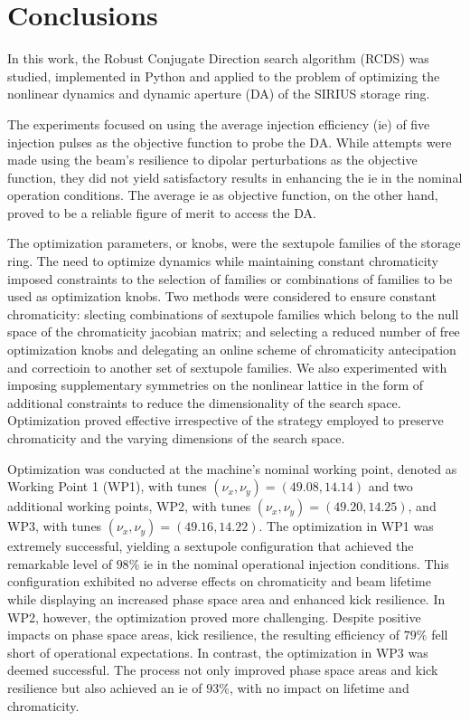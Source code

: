 \chapter{Conclusions}

In this work, the Robust Conjugate Direction search algorithm (\gls*{RCDS}) was studied, implemented in Python and applied to the problem of optimizing the nonlinear dynamics and dynamic aperture (\gls*{DA}) of the SIRIUS storage ring.

The experiments focused on using the average injection efficiency (\gls*{ie}) of five injection pulses as the objective function to probe the \gls*{DA}. While attempts were made using the beam's resilience to dipolar perturbations as the objective function, they did not yield satisfactory results in enhancing the \gls*{ie} in the nominal operation conditions. The average \gls*{ie} as objective function, on the other hand, proved to be a reliable figure of merit to access the \gls*{DA}.

The optimization parameters, or knobs, were the sextupole families of the storage ring. The need to optimize dynamics while maintaining constant chromaticity imposed constraints to the selection of families or combinations of families to be used as optimization knobs. Two methods were considered to ensure constant chromaticity: slecting combinations of sextupole families which belong to the null space of the chromaticity jacobian matrix; and selecting a reduced number of free optimization knobs and delegating an online scheme of chromaticity antecipation and correctioin to another set of sextupole families. We also experimented with imposing supplementary symmetries on the nonlinear lattice in the form of additional constraints to reduce the dimensionality of the search space. Optimization proved effective irrespective of the strategy employed to preserve chromaticity and the varying dimensions of the search space.

Optimization was conducted at the machine's nominal working point, denoted as Working Point 1 (\gls*{WP1}), with tunes $(\nu_x, \nu_y)=(49.08, 14.14)$ and two additional working points, \gls*{WP2}, with tunes $(\nu_x, \nu_y)=(49.20, 14.25)$, and \gls*{WP3}, with tunes $(\nu_x, \nu_y)=(49.16, 14.22)$. The optimization in WP1 was extremely successful, yielding a sextupole configuration that achieved the remarkable level of $98\%$ \gls*{ie} in the nominal operational injection conditions. This configuration exhibited no adverse effects on chromaticity and beam lifetime while displaying an increased phase space area and enhanced kick resilience. In \gls*{WP2}, however, the optimization proved more challenging. Despite positive impacts on phase space areas, kick resilience, the resulting efficiency of $79\%$ fell short of operational expectations. In contrast, the optimization in \gls{WP3} was deemed successful. The process not only improved phase space areas and kick resilience but also achieved an \gls*{ie} of $93\%$, with no impact on lifetime and chromaticity.

